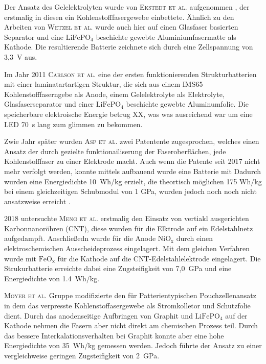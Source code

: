 Der Ansatz des Gelelektrolyten wurde von \textsc{Ekstedt et al.} aufgenommen \cite{Ekstedt2010}, der erstmalig in diesen ein Kohlenstofffasergewebe einbettete. Ähnlich zu den Arbeiten von \textsc{Wetzel et al.} wurde auch hier auf einen Glasfaser basierten Separator und eine $\text{LiFePO}_\text{4}$ beschichte gewebte Aluminiumfasermatte als Kathode. Die resultierende Batterie zeichnete sich durch eine Zellspannung von 3,3~V aus.

Im Jahr 2011 \textsc{Carlson et al.} \cite{Carlson2011} eine der ersten funktionierenden Strukturbatterien mit einer laminatartartigen Struktur, die sich aus einem IMS65 Kohlenstofffaserngebe als Anode, einem Gelelektrolyte als Elektrolyte, Glasfaserseparator und einer  $\text{LiFePO}_\text{4}$ beschichte gewebte Aluminumfolie. Die speicherbare elektroische Energie betrug XX, was  was ausreichend war um eine LED 70~s lang zum glimmen zu bekommen.

Zwie Jahr später wurden \textsc{Asp et al.} \cite{Asp2013US,Asp2013CN} zwei Patentente zugesprochen, welches einen Ansatz der durch gezielte funktionailiserung der Faseroberflächen, jede Kohlenstofffaser zu einer Elektrode macht. Auch wenn die Patente seit 2017 nicht mehr verfolgt werden, konnte mittels aufbauend wurde eine Batterie mit 
Dadurch wurden eine Energiedichte 10~Wh/kg erzielt, die theortisch möglichen 175 Wh/kg bei einem gleichzeitigen Schubmodul von 1 GPa, wurden jedoch noch noch nicht ansatzweise erreicht \cite{Leijonmarck2013, Carlson2013}.

2018 untersuchte \textsc{Meng et al.} \cite{Meng2018} erstmalig den Einsatz von vertiakl ausgerichten Karbonnanoröhren (CNT), diese wurden für die Elktrode auf ein Edelstahlnetz aufgedampft. Anschließedn wurde für die Anode $\text{NiO}_\text{x}$ durch einen elektroschemischen Ausscheideprozess eingelagert. Mit dem gleichen Verfahren wurde mit $\text{FeO}_\text{x}$ für die Kathode auf die CNT-Edelstahlelektrode eingelagert. Die Strukurbatterie erreichte dabei eine Zugsteifigkeit von 7,0~GPa und eine Energiedichte von 1.4~Wh/kg.

\textsc{Moyer et al.} \cite{Moyer2020} Gruppe modifizierte den für Patterientypischen Pouchzellenansatz in dem das verpresste Kohlenstoffasergewebe als Stromkolletor und Schutzfolie dient. Durch das anodenseitige Aufbringen von Graphit und $\text{LiFePO}_\text{4}$ auf der Kathode nehmen die Fasern aber nicht direkt am chemischen Prozess teil. Durch das bessere Interkalationsverhalten bei Graphit konnte aber eine hohe Energiedichte von 35~Wh/kg gemessen werden. Jedoch führte der Ansatz zu einer vergleichweise geringen Zugsteifigkeit von 2~GPa.

